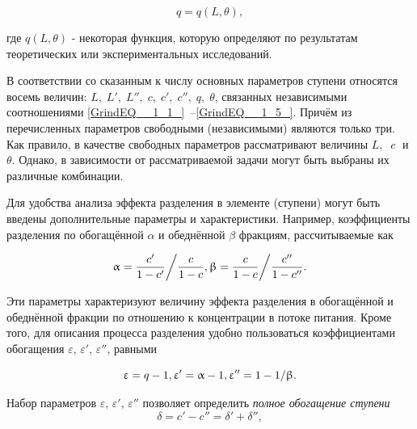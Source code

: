 \begin{equation} \label{GrindEQ__1_5_} 
q=q(L,\theta ), 
\end{equation} 

где $q(L,\theta )$ - некоторая функция, которую определяют по результатам теоретических или экспериментальных исследований.

В соответствии со сказанным к числу основных параметров ступени относятся восемь величин: $L,\; L',\; L'',\; c,\; c',\; c'',\; q,\; \theta $, связанных независимыми соотношениями \ref{GrindEQ__1_1_}~--\ref{GrindEQ__1_5_}. Причём из перечисленных параметров свободными (независимыми) являются только три. Как правило, в качестве свободных параметров рассматривают величины $L,\; \; c\; $ и $\theta $. Однако, в зависимости от рассматриваемой задачи могут быть выбраны их различные комбинации.

Для удобства анализа эффекта разделения в элементе (ступени) могут быть введены дополнительные параметры и характеристики. Например, коэффициенты разделения по обогащённой $\alpha $ и обеднённой $\beta $ фракциям, рассчитываемые как

\begin{equation} \label{GrindEQ__1_6_} 
\alpha ={\frac{c'}{1-c'}  \mathord{\left/{\vphantom{\frac{c'}{1-c'}  \frac{c}{1-c} }}\right.\kern-\nulldelimiterspace} \frac{c}{1-c} }  , \beta ={\frac{c}{1-c}  \mathord{\left/{\vphantom{\frac{c}{1-c}  \frac{c''}{1-c''} }}\right.\kern-\nulldelimiterspace} \frac{c''}{1-c''} } .        
\end{equation} 

Эти параметры характеризуют величину эффекта разделения в обогащённой и обеднённой фракции по отношению к концентрации в потоке питания. Кроме того, для описания процесса разделения удобно пользоваться коэффициентами обогащения $\varepsilon $, $\varepsilon '$, $\varepsilon ''$, равными

\begin{equation} \label{GrindEQ__1_7_} 
\varepsilon =q-1, \varepsilon '=\alpha -1, \varepsilon ''=1-{1 \mathord{\left/{\vphantom{1 \beta }}\right.\kern-\nulldelimiterspace} \beta } .             
\end{equation} 

Набор параметров $\varepsilon $, $\varepsilon '$, $\varepsilon ''$ позволяет определить \textit{полное обогащение ступени}
\begin{equation} \label{GrindEQ__1_8_} 
\delta =c'-c''=\delta '+\delta '',                          
\end{equation} 


